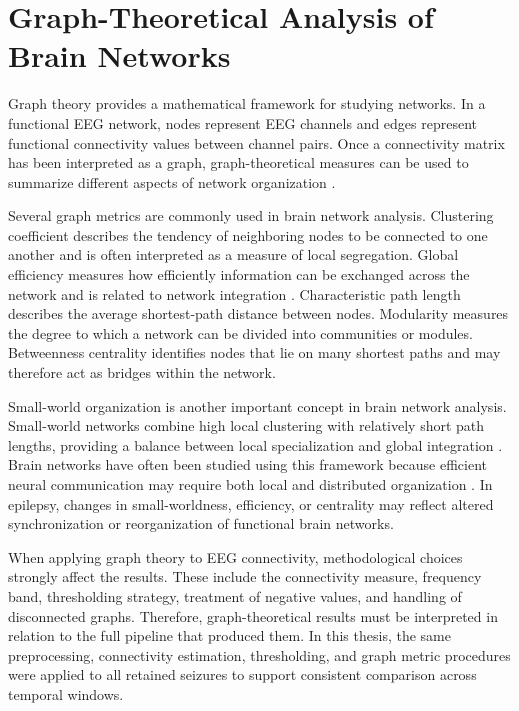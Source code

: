 \section{Graph-Theoretical Analysis of Brain Networks}
\label{sec:background-graph-theory}

Graph theory provides a mathematical framework for studying networks. In a
functional EEG network, nodes represent EEG channels and edges represent
functional connectivity values between channel pairs. Once a connectivity matrix
has been interpreted as a graph, graph-theoretical measures can be used to
summarize different aspects of network organization \cite{Rubinov2010}.

Several graph metrics are commonly used in brain network analysis. Clustering
coefficient describes the tendency of neighboring nodes to be connected to one
another and is often interpreted as a measure of local segregation. Global
efficiency measures how efficiently information can be exchanged across the
network and is related to network integration \cite{Latora2001,Rubinov2010}.
Characteristic path length describes the average shortest-path distance between
nodes. Modularity measures the degree to which a network can be divided into
communities or modules. Betweenness centrality identifies nodes that lie on many
shortest paths and may therefore act as bridges within the network.

Small-world organization is another important concept in brain network
analysis. Small-world networks combine high local clustering with relatively
short path lengths, providing a balance between local specialization and global
integration \cite{Watts1998}. Brain networks have often been studied using this
framework because efficient neural communication may require both local and
distributed organization \cite{Rubinov2010}. In epilepsy, changes in
small-worldness, efficiency, or centrality may reflect altered synchronization
or reorganization of functional brain networks.

When applying graph theory to EEG connectivity, methodological choices strongly
affect the results. These include the connectivity measure, frequency band,
thresholding strategy, treatment of negative values, and handling of disconnected
graphs. Therefore, graph-theoretical results must be interpreted in relation to
the full pipeline that produced them. In this thesis, the same preprocessing,
connectivity estimation, thresholding, and graph metric procedures were applied
to all retained seizures to support consistent comparison across temporal
windows.

